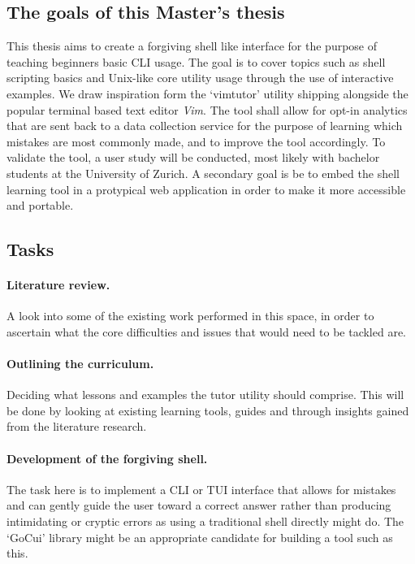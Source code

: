 \documentclass{task_description}
\begin{document}
\subsection*{The goals of this Master's thesis}

This thesis aims to create a forgiving shell like interface for the purpose of
teaching beginners basic CLI usage. The goal is to cover topics such as shell
scripting basics and Unix-like core utility usage through the use of
interactive examples. We draw inspiration form the `vimtutor'
\cite{pierce_ware_smith_moolenaar_2019} utility shipping alongside the
popular terminal based text editor \emph{Vim}. The tool shall allow for opt-in
analytics that are sent back to a data collection service for the purpose of
learning which mistakes are most commonly made, and to improve the tool
accordingly. To validate the tool, a user study will be conducted,
most likely with bachelor students at the University of Zurich.
A secondary goal is be to embed the shell learning tool in a protypical web
application in order to make it more accessible and portable.

\subsection*{Tasks}

\paragraph{Literature review.} A look into some of the existing work performed in
this space, in order to ascertain what the core difficulties and issues that
would need to be tackled are. 

\paragraph{Outlining the curriculum.} Deciding what lessons and examples
the tutor utility should comprise. This will be done by looking at existing
learning tools, guides and through insights gained from the literature
research.

\paragraph{Development of the forgiving shell.} The task here is to
implement a CLI or TUI interface that allows for mistakes and can gently guide
the user toward a correct answer rather than producing intimidating or cryptic
errors as using a traditional shell directly might do. The `GoCui' library
might be an appropriate candidate for building a tool such as this.
\end{document}
